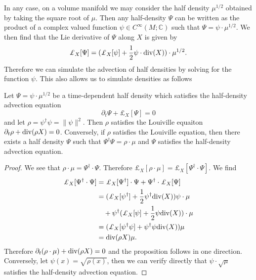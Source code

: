 In any case, on a volume manifold we may consider the half density $\mu^{1/2}$ obtained by taking the square root of $\mu$.
Then any half-density $\Psi$ can be written as the product of a complex valued function $\psi \in C^{\infty}(M ; \mathbb{C})$ such that $\Psi = \psi \cdot \mu^{1/2}$.
We then find that the Lie derivative of $\Psi$ along $X$ is given by
\[
	\pounds_X[ \Psi] = ( \pounds_X[ \psi] + \frac{1}{2} \psi \cdot {\rm div}(X) ) \cdot \mu^{1/2}.
\]
Therefore we can simulate the advection of half densities by solving for the function $\psi$.  This also allows us to simulate densities as follows
\begin{proposition}
	Let $\Psi = \psi \cdot \mu^{1/2}$ be a time-dependent half density which satisfies the half-density advection equation
	\[
		\partial_t \Psi + \pounds_X [\Psi] = 0
	\]
	and let $\rho = \psi^\dagger \psi = \| \psi \|^2$.  Then $\rho$ satisfies the Louiville equaiton $\partial_t \rho + {\rm div}( \rho X ) = 0$.
	Conversely, if $\rho$ satisfies the Louiville equation, then there exists a half density $\Psi$ such that $\Psi^\dagger \Psi = \rho \cdot \mu$ and $\Psi$ satisfies the half-density advection equation.
\end{proposition}
\begin{proof}
	We see that $\rho \cdot \mu = \Psi^\dagger \cdot \Psi$.  Therefore $\pounds_X[ \rho \cdot \mu] = \pounds_X [\Psi^\dagger \cdot \Psi]$.
	We find
	\begin{align*}
		\pounds_X [\Psi^\dagger \cdot \Psi] &= \pounds_X[ \Psi^\dagger] \cdot \Psi + \Psi^\dagger \cdot \pounds_X [ \Psi ] \\
			&= (\pounds_X[ \psi^\dagger] + \frac{1}{2} \psi^{\dagger} {\rm div}(X) ) \psi \cdot \mu \\
			&\quad + \psi^\dagger ( \pounds_X[ \psi] + \frac{1}{2} \psi {\rm div}(X)) \cdot \mu \\
			&= (\pounds_X[ \psi^\dagger \psi] + \psi^\dagger \psi {\rm div}(X) ) \mu \\
			&= {\rm div}( \rho X) \mu.
	\end{align*}
	Therefore $\partial_t ( \rho \cdot \mu) + {\rm div}( \rho X) = 0$ and the proposition follows in one direction.  Conversely, let $\psi(x) = \sqrt{ \rho(x)}$, then we can verify directly that $\psi \cdot \sqrt{\mu}$ satisfies the half-density advection equation.
\end{proof}
%
%

